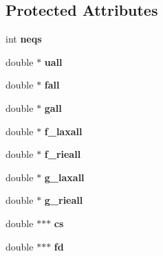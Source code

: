 \subsection*{Protected Attributes}
\begin{DoxyCompactItemize}
\item 
\hypertarget{classForce_a907a325345155efe7b3ba4ec182ede2e}{int {\bfseries neqs}}\label{classForce_a907a325345155efe7b3ba4ec182ede2e}

\item 
\hypertarget{classForce_aee5c074eaaab2b1a4304317628102c78}{double $\ast$ {\bfseries uall}}\label{classForce_aee5c074eaaab2b1a4304317628102c78}

\item 
\hypertarget{classForce_adbb006665c3b6192b8bcd65ad0077e9e}{double $\ast$ {\bfseries fall}}\label{classForce_adbb006665c3b6192b8bcd65ad0077e9e}

\item 
\hypertarget{classForce_a6925da28ddbfbfa5157093d67285ee38}{double $\ast$ {\bfseries gall}}\label{classForce_a6925da28ddbfbfa5157093d67285ee38}

\item 
\hypertarget{classForce_a188408f567873a822d9e63267d613f3c}{double $\ast$ {\bfseries f\-\_\-laxall}}\label{classForce_a188408f567873a822d9e63267d613f3c}

\item 
\hypertarget{classForce_a7180e4de77cf8299a0dd4333057c7d26}{double $\ast$ {\bfseries f\-\_\-rieall}}\label{classForce_a7180e4de77cf8299a0dd4333057c7d26}

\item 
\hypertarget{classForce_a89e725ac253fb6274ce747f93d87c8a0}{double $\ast$ {\bfseries g\-\_\-laxall}}\label{classForce_a89e725ac253fb6274ce747f93d87c8a0}

\item 
\hypertarget{classForce_aaa1af4cc9174fdabf16f8e822c02840a}{double $\ast$ {\bfseries g\-\_\-rieall}}\label{classForce_aaa1af4cc9174fdabf16f8e822c02840a}

\item 
\hypertarget{classForce_a04c220d5edd00045706c95c929086c95}{double $\ast$$\ast$$\ast$ {\bfseries cs}}\label{classForce_a04c220d5edd00045706c95c929086c95}

\item 
\hypertarget{classForce_a94180f5b1cd0087c0fd5c309a1edb747}{double $\ast$$\ast$$\ast$ {\bfseries fd}}\label{classForce_a94180f5b1cd0087c0fd5c309a1edb747}


\end{DoxyCompactItemize}
